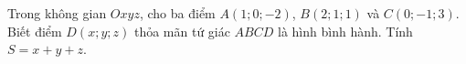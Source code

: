 \begin{ex}
Trong không gian $Oxyz$, cho ba điểm $A(1;0;-2)$, $B(2;1;1)$ và $C(0;-1;3)$. Biết điểm $D(x;y;z)$ thỏa mãn tứ giác $ABCD$ là hình bình hành. Tính $S=x+y+z$.
\end{ex}
